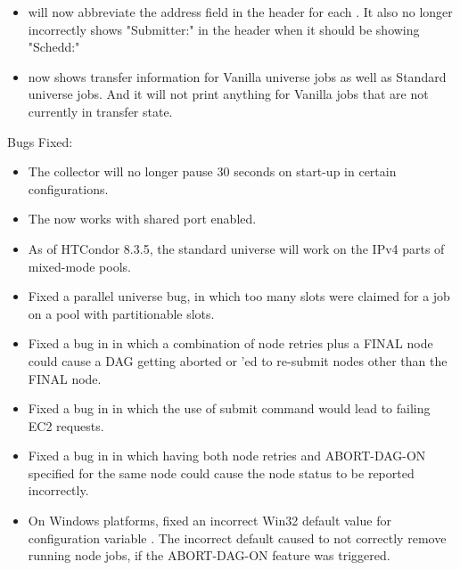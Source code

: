 \begin{itemize}
\item {} will now abbreviate the address field in the header for each . It also
no longer incorrectly shows "Submitter:" in the header when it should be showing "Schedd:"

\item {}  now shows transfer information for Vanilla universe jobs as well as Standard universe jobs.
And it will not print anything for Vanilla jobs that are not currently in transfer state.


\end{itemize}

\noindent Bugs Fixed:

\begin{itemize}

\item The collector will no longer pause 30 seconds on start-up in certain
configurations.

\item The  now works with shared port enabled.

\item As of HTCondor 8.3.5, the standard universe will work on the IPv4
parts of mixed-mode pools.

\item Fixed a parallel universe bug,
in which too many slots were claimed for a job
on a pool with partitionable slots.

\item Fixed a bug in  in which a combination of node
retries plus a FINAL node could cause a DAG getting aborted or
'ed to re-submit nodes other than the FINAL node.

\item Fixed a bug in  in which the use of submit command
 would lead to failing EC2 requests.

\item Fixed a bug in  in which having both node retries
and ABORT-DAG-ON specified for the same node could cause the node
status to be reported incorrectly.

\item On Windows platforms, fixed an incorrect Win32 default value for
configuration variable .
The incorrect default caused 
to not correctly remove running node jobs,
if the ABORT-DAG-ON feature was triggered.


\end{itemize}
